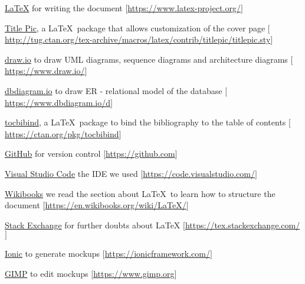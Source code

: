 \begin{thebibliography}{0}
  \href{https://www.latex-project.org/}{\LaTeX}  for writing the document {\scriptsize \newline$[$\url{https://www.latex-project.org/}$]$}


   \href{http://tug.ctan.org/tex-archive/macros/latex/contrib/titlepic/titlepic.sty}{Title Pic}, a \LaTeX \ package that allows customization of the cover page
  {\scriptsize \newline$[$\url{http://tug.ctan.org/tex-archive/macros/latex/contrib/titlepic/titlepic.sty}$]$}

   \href{https://www.draw.io/}{draw.io} to draw UML diagrams, sequence diagrams and architecture diagrams
  {\scriptsize \newline$[$\url{https://www.draw.io/}$]$}

   \href{https://www.dbdiagram.io/d}{dbdiagram.io} to draw ER - relational model of the database
  {\scriptsize \newline$[$\url{https://www.dbdiagram.io/d}$]$}

   \href{https://ctan.org/pkg/tocbibind}{tocbibind}, a \LaTeX \ package to bind the bibliography to the table of contents
  {\scriptsize \newline$[$\url{https://ctan.org/pkg/tocbibind}$]$}

   \href{https://github.com}{GitHub} for version control
  {\scriptsize \newline$[$\url{https://github.com}$]$}

   \href{https://code.visualstudio.com/}{Visual Studio Code} the IDE we used
  {\scriptsize \newline$[$\url{https://code.visualstudio.com/}$]$}

   \href{https://en.wikibooks.org/wiki/LaTeX/}{Wikibooks} we read the section about \LaTeX \ to learn how to structure the document
  {\scriptsize \newline$[$\url{https://en.wikibooks.org/wiki/LaTeX/}$]$}

   \href{https://tex.stackexchange.com/}{Stack Exchange} for further doubts about \LaTeX
  {\scriptsize \newline$[$\url{https://tex.stackexchange.com/}$]$}

   \href{https://ionicframework.com/}{Ionic} to generate mockups
  {\scriptsize \newline$[$\url{https://ionicframework.com/}$]$}

   \href{https://www.gimp.org}{GIMP} to edit mockups
  {\scriptsize \newline$[$\url{https://www.gimp.org}$]$}
\end{thebibliography}